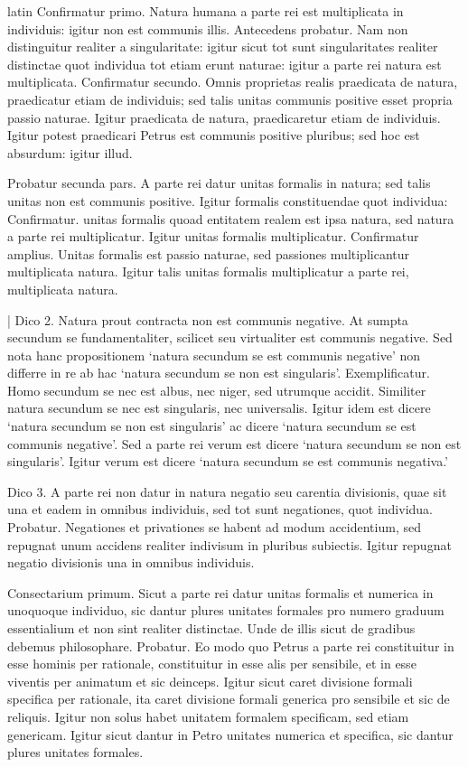 \begin{otherlanguage*}{latin}
\pstart
 Confirmatur primo. Natura humana a parte rei est multiplicata in individuis: igitur non est communis illis. Antecedens probatur. Nam non distinguitur realiter a singularitate: igitur sicut tot sunt singularitates realiter distinctae quot individua tot etiam erunt naturae: igitur a parte rei natura est multiplicata. Confirmatur secundo. Omnis proprietas realis praedicata de natura, praedicatur etiam de individuis; sed talis unitas communis positive esset propria passio naturae. Igitur praedicata de natura, praedicaretur etiam de individuis. Igitur potest praedicari Petrus est communis positive pluribus; sed hoc est absurdum: igitur illud. 
\pend

\pstart
 Probatur secunda pars. A parte rei datur unitas formalis in natura; sed talis unitas non est communis positive. Igitur formalis constituendae quot individua: Confirmatur. unitas formalis quoad entitatem realem est ipsa natura, sed natura a parte rei multiplicatur. Igitur unitas formalis multiplicatur. Confirmatur amplius. Unitas formalis est passio naturae, sed passiones multiplicantur multiplicata natura. Igitur talis unitas formalis multiplicatur a parte rei, multiplicata natura. 
\pend

\pstart
 \textnormal{|}  Dico 2. Natura prout contracta non est communis negative. At sumpta secundum se fundamentaliter, scilicet seu virtualiter est communis negative. Sed nota hanc propositionem `natura secundum se est communis negative' non differre in re ab hac `natura secundum se non est singularis'. Exemplificatur. Homo secundum se nec est albus, nec niger, sed utrumque accidit. Similiter natura secundum se nec est singularis, nec universalis. Igitur idem est dicere `natura secundum se non est singularis' ac dicere `natura secundum se est communis negative'. Sed a parte rei verum est dicere `natura secundum se non est singularis'. Igitur verum est dicere `natura secundum se est communis negativa.' 
\pend

\pstart
 Dico 3. A parte rei non datur in natura negatio seu carentia divisionis, quae sit una et eadem in omnibus individuis, sed tot sunt negationes, quot individua. Probatur. Negationes et privationes se habent ad modum accidentium, sed repugnat unum accidens realiter indivisum in pluribus subiectis. Igitur repugnat negatio divisionis una in omnibus individuis. 
\pend

\pstart
 Consectarium primum. Sicut a parte rei datur unitas formalis et numerica in unoquoque individuo, sic dantur plures unitates formales pro numero graduum essentialium et non sint realiter distinctae. Unde de illis sicut de gradibus debemus philosophare. Probatur. Eo modo quo Petrus a parte rei constituitur in esse hominis per rationale, constituitur in esse alis per sensibile, et in esse viventis per animatum et sic deinceps. Igitur sicut caret divisione formali specifica per rationale, ita caret divisione formali generica pro sensibile et sic de reliquis. Igitur non solus habet unitatem formalem specificam, sed etiam genericam. Igitur sicut dantur in Petro unitates numerica et specifica, sic dantur plures unitates formales. 
\pend


\end{otherlanguage*}
